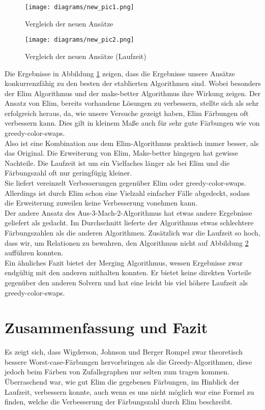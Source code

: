 \documentclass[11pt]{article}
\begin{document}
\begin{figure}
  \texttt{[image: diagrams/new\_pic1.png]}
  \caption{Vergleich der neuen Ansätze}
  \label{fig:oursolvers1}
\end{figure}
\begin{figure}
  \texttt{[image: diagrams/new\_pic2.png]}
  \caption{Vergleich der neuen Ansätze (Laufzeit)}
  \label{fig:oursolvers2}
\end{figure}
Die Ergebnisse in Abbildung \ref{fig:oursolvers1} zeigen, 
dass die Ergebnisse unsere Ansätze konkurrenzfähig
zu den besten der etablierten Algorithmen sind.
Wobei besonders der Elim Algorithmus und der make-better Algorithmus ihre Wirkung zeigen.
Der Ansatz von Elim, bereits vorhandene Lösungen zu verbessern, stellte sich als sehr erfolgreich heraus,
da, wie unsere Versuche gezeigt haben, Elim Färbungen oft verbessern kann. Dies gilt in kleinem Maße auch für sehr gute Färbungen wie von greedy-color-swaps.\\
Also ist eine Kombination aus dem Elim-Algorithmus praktisch immer besser, als das Original.
Die Erweiterung von Elim, Make-better hingegen hat gewisse Nachteile. Die Laufzeit ist um ein Vielfaches länger als bei Elim und die Färbungszahl oft nur geringfügig kleiner. \\ %
Sie liefert vereinzelt Verbesserungen gegenüber Elim oder greedy-color-swaps. Allerdings ist durch Elim schon eine Vielzahl einfacher Fälle abgedeckt, sodass die Erweiterung zuweilen keine Verbesserung vonehmen kann. \\
Der andere Ansatz des Aus-3-Mach-2-Algorithmus hat etwas andere Ergebnisse geliefert als gedacht. 
Im Durchschnitt lieferte der Algorithmus etwas schlechtere Färbungszahlen als die anderen Algorithmen.
Zusätzlich war die Laufzeit so hoch, dass wir, um Relationen zu bewahren, den Algorithmus nicht auf Abbildung \ref{fig:oursolvers2} aufführen konnten. \\
Ein ähnliches Fazit bietet der Merging Algorithmus, wessen Ergebnisse zwar endgültig mit den anderen mithalten konnten.
Er bietet keine direkten Vorteile gegenüber den anderen Solvern und hat eine leicht bis viel höhere Laufzeit als greedy-color-swaps.

\section{Zusammenfassung und Fazit} 

Es zeigt sich, dass Wigderson, Johnson und Berger Rompel zwar theoretisch bessere Worst-case-Färbungen hervorbringen als die Greedy-Algorithmen, diese jedoch beim Färben von Zufallsgraphen nur selten zum tragen kommen. \\
Überraschend war, wie gut Elim die gegebenen Färbungen, im Hinblick der Laufzeit, verbessern konnte, auch wenn es uns nicht möglich war eine Formel zu finden, welche die Verbesserung der Färbungszahl durch Elim beschreibt.
\end{document}
